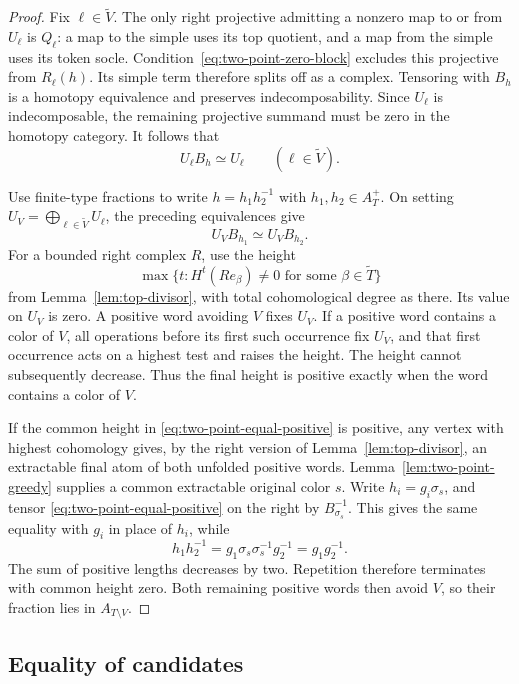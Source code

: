 \begin{proof}
Fix \(\ell\in\widetilde V\).  The only right projective admitting a
nonzero map to or from \(U_\ell\) is \(Q_\ell\): a map to the simple
uses its top quotient, and a map from the simple uses its token
socle.  Condition~\eqref{eq:two-point-zero-block} excludes this
projective from \(R_\ell(h)\).  Its simple term therefore splits off
as a complex.  Tensoring with \(B_h\) is a homotopy equivalence and
preserves indecomposability.  Since \(U_\ell\) is indecomposable, the
remaining projective summand must be zero in the homotopy category.
It follows that
\[
 U_\ell B_h\simeq U_\ell\qquad(\ell\in\widetilde V).
\]

Use finite-type fractions to write \(h=h_1h_2^{-1}\) with
\(h_1,h_2\in A_T^+\).  On setting
\(U_V=\bigoplus_{\ell\in\widetilde V}U_\ell\), the preceding
equivalences give
\begin{equation}
\label{eq:two-point-equal-positive}
 U_V B_{h_1}\simeq U_V B_{h_2}.
\end{equation}
For a bounded right complex \(R\), use the height
\[
 \max\{t:H^t(Re_\beta)\ne0
                    \text{ for some }\beta\in\widetilde T\}
\]
from Lemma~\ref{lem:top-divisor}, with total cohomological degree as
there.  Its value on \(U_V\) is zero.  A positive word avoiding
\(V\) fixes \(U_V\).  If a positive word contains a color of \(V\),
all operations before its first such occurrence fix \(U_V\), and
that first occurrence acts on a highest test and raises the height.
The height cannot subsequently decrease.  Thus the final height is
positive exactly when the word contains a color of \(V\).

If the common height in \eqref{eq:two-point-equal-positive} is
positive, any vertex with highest cohomology gives, by the right
version of Lemma~\ref{lem:top-divisor}, an extractable final atom of
both unfolded positive words.  Lemma~\ref{lem:two-point-greedy}
supplies a common extractable original color \(s\).  Write
\(h_i=g_i\sigma_s\), and tensor
\eqref{eq:two-point-equal-positive} on the right by
\(B_{\sigma_s}^{-1}\).  This gives the same equality with \(g_i\)
in place of \(h_i\), while
\[
 h_1h_2^{-1}=g_1\sigma_s\sigma_s^{-1}g_2^{-1}=g_1g_2^{-1}.
\]
The sum of positive lengths decreases by two.  Repetition therefore
terminates with common height zero.  Both remaining positive words
then avoid \(V\), so their fraction lies in \(A_{T\setminus V}\).
\end{proof}

\subsection{Equality of candidates}

